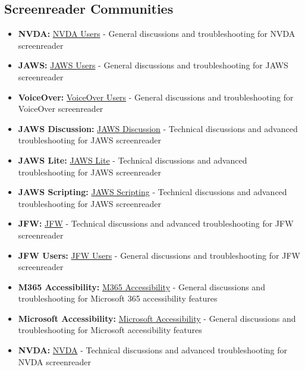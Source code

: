 \subsection{Screenreader Communities}\label{app2:screenreader-communities}
\begin{itemize}
	\item \textbf{NVDA:} \href{https://groups.google.com/a/nvaccess.org/g/NVDA-users}{NVDA Users} - General discussions and troubleshooting for NVDA screenreader
	\item \textbf{JAWS:} \href{https://groups.io/g/jaws-users}{JAWS Users} - General discussions and troubleshooting for JAWS screenreader
	\item \textbf{VoiceOver:} \href{https://groups.io/g/voiceover-users}{VoiceOver Users} - General discussions and troubleshooting for VoiceOver screenreader
	\item \textbf{JAWS Discussion:} \href{https://groups.io/g/jawsdiscussion/messages}{JAWS Discussion} - Technical discussions and advanced troubleshooting for JAWS screenreader
	\item \textbf{JAWS Lite:} \href{https://groups.io/g/jawslite/messages}{JAWS Lite} - Technical discussions and advanced troubleshooting for JAWS screenreader
	\item \textbf{JAWS Scripting:} \href{https://groups.io/g/jawsscripting/messages}{JAWS Scripting} - Technical discussions and advanced troubleshooting for JAWS screenreader
	\item \textbf{JFW:} \href{https://jfw.groups.io/g/main/messages}{JFW} - Technical discussions and advanced troubleshooting for JFW screenreader
	\item \textbf{JFW Users:} \href{https://groups.io/g/jfw-users/messages}{JFW Users} - General discussions and troubleshooting for JFW screenreader
	\item \textbf{M365 Accessibility:} \href{https://groups.io/g/M365-Accessibility/messages}{M365 Accessibility} - General discussions and troubleshooting for Microsoft 365 accessibility features
	\item \textbf{Microsoft Accessibility:} \href{https://groups.io/g/MicrosoftAccessibility/messages}{Microsoft Accessibility} - General discussions and troubleshooting for Microsoft accessibility features
	\item \textbf{NVDA:} \href{https://NVDA.groups.io/g/NVDA/messages}{NVDA} - Technical discussions and advanced troubleshooting for NVDA screenreader

\end{itemize}
